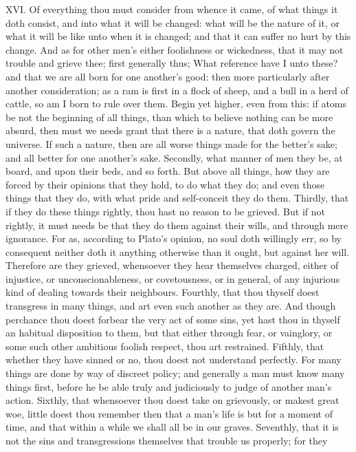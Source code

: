 XVI. Of everything thou must consider from whence it came, of what
things it doth consist, and into what it will be changed: what will be the
nature of it, or what it will be like unto when it is changed; and that it
can suffer no hurt by this change. And as for other men's either
foolishness or wickedness, that it may not trouble and grieve thee; first
generally thus; What reference have I unto these? and that we are all born
for one another's good: then more particularly after another
consideration; as a ram is first in a flock of sheep, and a bull in a herd
of cattle, so am I born to rule over them. Begin yet higher, even from
this: if atoms be not the beginning of all things, than which to believe
nothing can be more absurd, then must we needs grant that there is a
nature, that doth govern the universe. If such a nature, then are all
worse things made for the better's sake; and all better for one another's
sake. Secondly, what manner of men they be, at board, and upon their beds,
and so forth. But above all things, how they are forced by their opinions
that they hold, to do what they do; and even those things that they do,
with what pride and self-conceit they do them. Thirdly, that if they do
these things rightly, thou hast no reason to be grieved. But if not
rightly, it must needs be that they do them against their wills, and
through mere ignorance. For as, according to Plato's opinion, no soul doth
willingly err, so by consequent neither doth it anything otherwise than it
ought, but against her will. Therefore are they grieved, whensoever they
hear themselves charged, either of injustice, or unconscionableness, or
covetousness, or in general, of any injurious kind of dealing towards
their neighbours. Fourthly, that thou thyself doest transgress in many
things, and art even such another as they are. And though perchance thou
doest forbear the very act of some sins, yet hast thou in thyself an
habitual disposition to them, but that either through fear, or vainglory,
or some such other ambitious foolish respect, thou art restrained.
Fifthly, that whether they have sinned or no, thou doest not understand
perfectly. For many things are done by way of discreet policy; and
generally a man must know many things first, before he be able truly and
judiciously to judge of another man's action. Sixthly, that whensoever
thou doest take on grievously, or makest great woe, little doest thou
remember then that a man's life is but for a moment of time, and that
within a while we shall all be in our graves. Seventhly, that it is not
the sins and transgressions themselves that trouble us properly; for they
